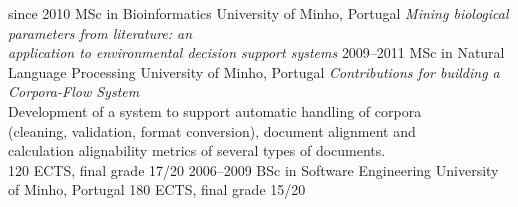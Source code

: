 \documentclass[a4paper]{friggeri-cv}
\begin{document}
\begin{entrylist}
  \entry
    {{\footnotesize since} 2010}
    {MSc in Bioinformatics}
    {University of Minho, Portugal}
    {\emph{Mining biological parameters from literature: an\\
	application to environmental decision support systems}}
  \entry
    {2009–2011}
    {MSc in Natural Language Processing}
    {University of Minho, Portugal}
    {\emph{Contributions for building a Corpora-Flow System}\\
	{\footnotesize{Development of a system to support automatic handling of corpora\\
	(cleaning, validation, format conversion), document alignment and\\
	calculation alignability metrics of several types of documents.}}\\
    120 ECTS, final grade 17/20
	}
  \entry
    {2006--2009}
    {BSc in Software Engineering}
    {University of Minho, Portugal}
    {180 ECTS, final grade 15/20}
\end{entrylist}
\end{document}
